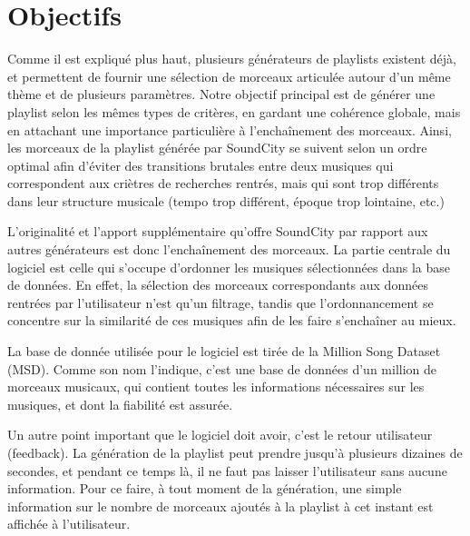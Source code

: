 
\section{Objectifs}
Comme il est expliqué plus haut, plusieurs générateurs de playlists existent
déjà, et permettent de fournir une sélection de morceaux articulée autour 
d'un même thème et de plusieurs paramètres.
Notre objectif principal est de générer une playlist selon les mêmes types 
de critères, en gardant une cohérence globale, mais en attachant une 
importance particulière à l'enchaînement des morceaux. Ainsi, les morceaux 
de la playlist générée par SoundCity se suivent selon un ordre optimal afin 
d'éviter des transitions brutales entre deux musiques qui correspondent aux 
criètres de recherches rentrés, mais qui sont trop différents dans leur 
structure musicale (tempo trop différent, époque trop lointaine, etc.)

L'originalité et l'apport supplémentaire qu'offre SoundCity par rapport aux 
autres générateurs est donc l'enchaînement des morceaux. La partie centrale 
du logiciel est celle qui s'occupe d'ordonner les musiques sélectionnées 
dans la base de données. En effet, la sélection des morceaux correspondants 
aux données rentrées par l'utilisateur n'est qu'un filtrage, tandis que 
l'ordonnancement se concentre sur la similarité de ces musiques afin de les 
faire s'enchaîner au mieux.

La base de donnée utilisée pour le logiciel est tirée de la Million Song 
Dataset (MSD). Comme son nom l'indique, c'est une base de données d'un 
million de morceaux musicaux, qui contient toutes les informations 
nécessaires sur les musiques, et dont la fiabilité est assurée.

Un autre point important que le logiciel doit avoir, c'est le retour 
utilisateur (feedback). La génération de la playlist peut prendre jusqu'à 
plusieurs dizaines de secondes, et pendant ce temps là, il ne faut pas 
laisser l'utilisateur sans aucune information. Pour ce faire, à tout moment 
de la génération, une simple information sur le nombre de morceaux ajoutés à 
la playlist à cet instant est affichée à l'utilisateur.